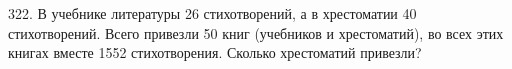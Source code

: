 322. В учебнике литературы 26 стихотворений, а в хрестоматии 40 стихотворений. Всего привезли 50 книг (учебников и хрестоматий), во всех этих книгах вместе
1552 стихотворения. Сколько хрестоматий привезли?\\
